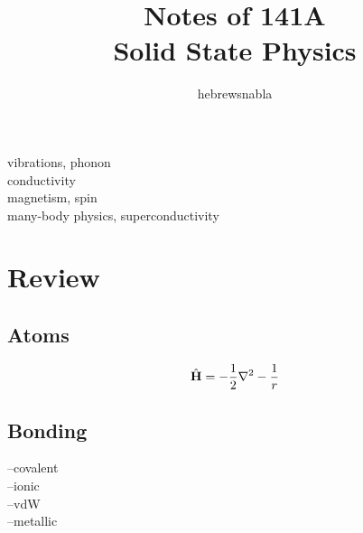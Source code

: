 \documentclass[UTF8]{ctexart} %
\title{Notes of 141A\\
Solid State Physics}
\author{hebrewsnabla}
\numberwithin{equation}{section}
\begin{document}
\maketitle

\tableofcontents

\newpage

vibrations, phonon\\
conductivity\\
magnetism, spin\\
many-body physics, superconductivity\\

\setcounter{section}{-1}
\section{Review}
\subsection{Atoms}
\begin{equation}\label{key}
\hat{\vb{H}} = -\dfrac{1}{2}\nabla^2 - \dfrac{1}{r}
\end{equation}

\subsection{Bonding}
 --covalent\\
 --ionic\\
 --vdW\\
 --metallic\\
\end{document}
